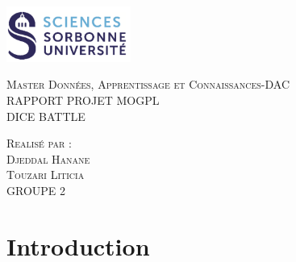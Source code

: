 \documentclass{report}
\begin{document}
\begin{titlepage}
    \begin{flushleft}
    \includegraphics[width=11em]{logo.png}\\[1.5cm]
    \end{flushleft}
    \begin{center}
        \textsc{{\LARGE \color{blue} Master Données, Apprentissage et Connaissances-DAC}}\\[5cm]
        \textsc{\Huge{RAPPORT PROJET MOGPL}}\\[1cm]
        \textsc{\Huge{DICE BATTLE}}\\[7cm]
        \begin{minipage}{1\textwidth}
            \begin{flushleft} \large
            \textsc{\LARGE{Realisé par :}}\\[0.5cm]
            \textsc{Djeddal Hanane}\\
            \textsc{Touzari Liticia}\\
            GROUPE 2\\
            \end{flushleft}
        \end{minipage}
        \vfill
    
        
    \end{center}
   
    
  \end{titlepage}
  \tableofcontents
  

  \chapter{Introduction}
\end{document}
